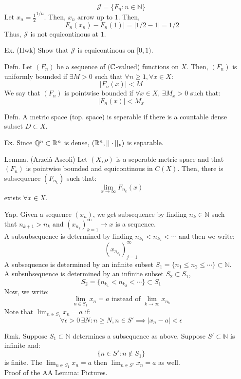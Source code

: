 \documentclass[12pt]{article}
\begin{document}
\begin{itemize}
    \[\mathcal{J} = \{F_n: n \in \mathbb{N}\}\]
    Let $x_n = \frac{1}{2}^{1/n}$. Then, $x_n$ arrow up to $1$. Then, 
    \[ |F_n(x_n) - F_n(1)| = |1/2 -1| = 1/2\]
    Thus, $\mathcal{J}$ is not equicontinous at $1$.
    \item[Ex. (Hwk)] Show that $\mathcal{J}$ is equicontinous on $[0, 1)$. 
    \item[Defn.] Let $(F_n)$ be a sequence of ($\mathbb C$-valued) functions on $X$. Then, $(F_n)$ is uniformly bounded if $\exists M > 0$ such that $\forall n \geq 1, \forall x \in X$:
    \[ |F_n(x)| < M \]
    We say that $(F_n)$ is pointwise bounded if $\forall x \in X$, $\exists M_x > 0$ such that:
    \[ |F_n(x)| < M_x \]
    \item[Defn.] A metric space (top. space) is seperable if there is a countable dense subset $D \subset X$. 
    \item[Ex.] Since $\mathbb Q^n \subset \mathbb R^n$ is dense, $(\mathbb R^n, ||\cdot||_p)$ is separable.  
    \item[Lemma.] (Arzelà-Ascoli) Let $(X, \rho)$ is a seperable metric space and that $(F_n)$ is pointwise bounded and equicontinous in $C(X)$. Then, there is subsequence $(F_{n_k})$ such that:
        \[ \lim_{x\to\infty} F_{n_k}(x)\]
    exists $\forall x \in X$.
    \item[Yap.] Given a sequence $(x_n)$, we get subsequence by finding $n_k \in \mathbb{N}$ such that $n_{k+1} > n_k$ and $(x_{n_k})_{k=1}^\infty \to x$ is a sequence. \\
    A subsubsequence is determined by finding $n_{k_1} < n_{k_2} < \cdots$ and then we write: 
    \[ (x_{n_{k_j}})_{j=1}^\infty\]
    A subsequence is determined by an infinite subset $S_1 = \{n_1 \leq n_2 \leq \cdots\} \subset \mathbb{N}$. A subsubsequence is determined by an infinite subset $S_2 \subset S_1$, 
    \[ S_2 = \{n_{k_1} < n_{k_2} < \cdots \} \subset S_1\]
    Now, we write: 
    \[ \lim_{n \in S_1} x_n = a \text{ instead of } \lim_{k \to \infty} x_{n_k}\]
    Note that $\lim_{n \in S_1} x_n = a$ if:
    \[ \forall \epsilon > 0\, \exists N: n \geq N, n \in S' \implies |x_n - a| < \epsilon\] 
    \item[Rmk.] Suppose $S_1 \subset \mathbb{N}$ determines a subsequence as above. Suppose $S' \subset \mathbb{N}$ is infinite and:
    \[\{n \in S' : n \not \in S_1\}\]
    is finite. The $\lim_{n \in S_1} x_n = a$ then $\lim_{n \in S'} x_n = a$ as well. \\
    Proof of the AA Lemma: Pictures. 
    \end{itemize}
\end{document}
